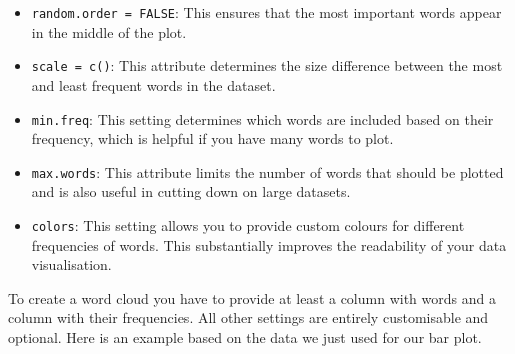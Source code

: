 \documentclass[
  letterpaper,
]{krantz}
\makeatletter
\newenvironment{Shaded}{\begin{snugshade}}{\end{snugshade}}
\newcommand{\AttributeTok}[1]{\textcolor[rgb]{0.40,0.45,0.13}{#1}}
\newcommand{\CommentTok}[1]{\textcolor[rgb]{0.37,0.37,0.37}{#1}}
\newcommand{\ConstantTok}[1]{\textcolor[rgb]{0.56,0.35,0.01}{#1}}
\newcommand{\DecValTok}[1]{\textcolor[rgb]{0.68,0.00,0.00}{#1}}
\newcommand{\FloatTok}[1]{\textcolor[rgb]{0.68,0.00,0.00}{#1}}
\newcommand{\FunctionTok}[1]{\textcolor[rgb]{0.28,0.35,0.67}{#1}}
\newcommand{\NormalTok}[1]{\textcolor[rgb]{0.00,0.23,0.31}{#1}}
\newcommand{\OtherTok}[1]{\textcolor[rgb]{0.00,0.23,0.31}{#1}}
\newcommand{\SpecialCharTok}[1]{\textcolor[rgb]{0.37,0.37,0.37}{#1}}
\newcommand{\StringTok}[1]{\textcolor[rgb]{0.13,0.47,0.30}{#1}}
\newenvironment{kframe}{%
\medskip{}
\setlength{\fboxsep}{.8em}
 \def\at@end@of@kframe{}%
 \ifinner\ifhmode%
  \def\at@end@of@kframe{\end{minipage}}%
  \begin{minipage}{\columnwidth}%
 \fi\fi%
 \def\FrameCommand##1{\hskip\@totalleftmargin \hskip-\fboxsep
 \colorbox{shadecolor}{##1}\hskip-\fboxsep
     \hskip-\linewidth \hskip-\@totalleftmargin \hskip\columnwidth}%
 \MakeFramed {\advance\hsize-\width
   \@totalleftmargin\z@ \linewidth\hsize
   \@setminipage}}%
 {\par\unskip\endMakeFramed%
 \at@end@of@kframe}
\renewenvironment{Shaded}{\begin{kframe}}{\end{kframe}}
\makeatother
\begin{document}
\begin{itemize}
\item
  \texttt{random.order\ =\ FALSE}: This ensures that the most important
  words appear in the middle of the plot.
\item
  \texttt{scale\ =\ c()}: This attribute determines the size difference
  between the most and least frequent words in the dataset.
\item
  \texttt{min.freq}: This setting determines which words are included
  based on their frequency, which is helpful if you have many words to
  plot.
\item
  \texttt{max.words}: This attribute limits the number of words that
  should be plotted and is also useful in cutting down on large
  datasets.
\item
  \texttt{colors}: This setting allows you to provide custom colours for
  different frequencies of words. This substantially improves the
  readability of your data visualisation.
\end{itemize}

To create a word cloud you have to provide at least a column with words
and a column with their frequencies. All other settings are entirely
customisable and optional. Here is an example based on the data we just
used for our bar plot.

\begin{Shaded}
\end{Shaded}
\end{document}
